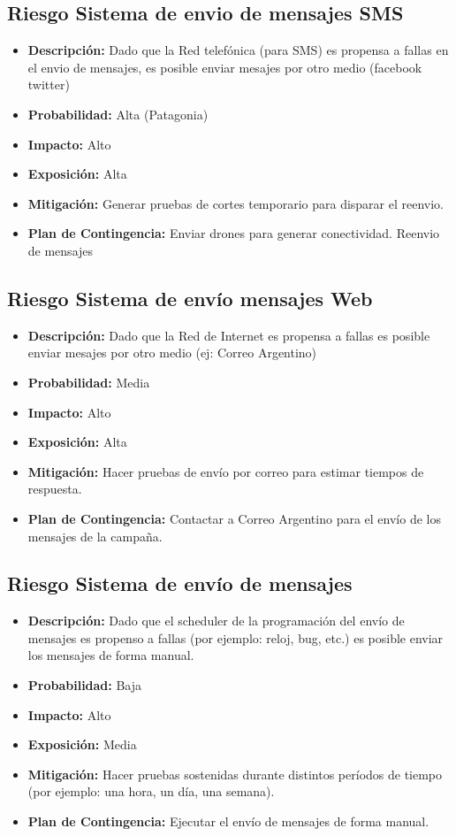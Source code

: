 \documentclass[a4paper, 11pt]{article}
\begin{document}
\subsection{Riesgo Sistema de envio de mensajes SMS}
\begin{itemize}
\item \textbf{Descripci\'on:} Dado que la Red telefónica (para SMS) es propensa a fallas en el envio de mensajes, es posible enviar mesajes por otro medio (facebook twitter)
\item \textbf{Probabilidad:} Alta (Patagonia)
\item \textbf{Impacto:} Alto
\item \textbf{Exposici\'on:} Alta
\item \textbf{Mitigaci\'on:} Generar pruebas de cortes temporario para disparar el reenvio.
\item \textbf{Plan de Contingencia:} Enviar drones para generar conectividad. Reenvio de mensajes
\end{itemize}


\subsection{Riesgo Sistema de envío mensajes Web}
\begin{itemize}
\item \textbf{Descripci\'on:} Dado que la Red de Internet es propensa a fallas es posible enviar mesajes por otro medio (ej: Correo Argentino) 
\item \textbf{Probabilidad:} Media 
\item \textbf{Impacto:} Alto
\item \textbf{Exposici\'on:} Alta
\item \textbf{Mitigaci\'on:} Hacer pruebas de env\'io por correo para estimar tiempos de respuesta. 
\item \textbf{Plan de Contingencia:} Contactar a Correo Argentino para el envío de los mensajes de la campa\~na.
\end{itemize}

\subsection{Riesgo Sistema de envío de mensajes}
\begin{itemize}
\item \textbf{Descripci\'on:} Dado que el scheduler de la programaci\'on del env\'io de mensajes es propenso a fallas (por ejemplo: reloj, bug, etc.) es posible enviar los mensajes de forma manual.
\item \textbf{Probabilidad:} Baja
\item \textbf{Impacto:} Alto
\item \textbf{Exposici\'on:} Media
\item \textbf{Mitigaci\'on:} Hacer pruebas sostenidas durante distintos per\'iodos de tiempo (por ejemplo: una hora, un d\'ia, una semana).
\item \textbf{Plan de Contingencia:} Ejecutar el env\'io de mensajes de forma manual.
\end{itemize}
\end{document}
